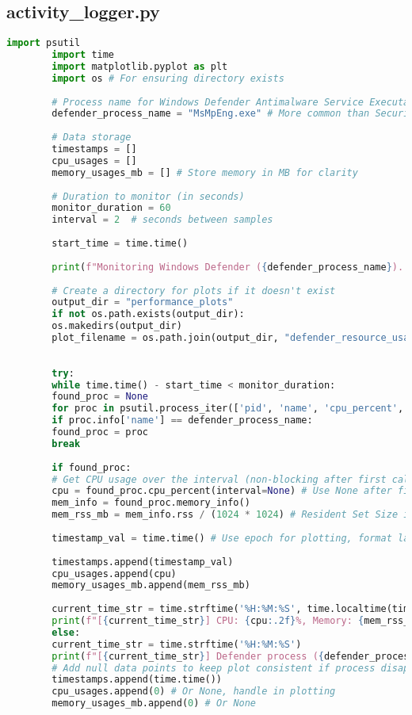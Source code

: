 \documentclass[11pt]{article}
\begin{document}
	\subsection{activity_logger.py}
	\begin{lstlisting}[language=Python, caption=activity_logger.py - Windows Defender Resource Monitor, basicnumbers=left, numberstyle=\tiny\color{gray}, stringstyle=\color{purple}, commentstyle=\color{olive}, keywordstyle=\color{blue}, breaklines=true, breakatwhitespace=true, tabsize=4, showstringspaces=false]
		import psutil
		import time
		import matplotlib.pyplot as plt
		import os # For ensuring directory exists
		
		# Process name for Windows Defender Antimalware Service Executable
		defender_process_name = "MsMpEng.exe" # More common than SecurityHealthService.exe for core engine
		
		# Data storage
		timestamps = []
		cpu_usages = []
		memory_usages_mb = [] # Store memory in MB for clarity
		
		# Duration to monitor (in seconds)
		monitor_duration = 60 
		interval = 2  # seconds between samples
		
		start_time = time.time()
		
		print(f"Monitoring Windows Defender ({defender_process_name})...")
		
		# Create a directory for plots if it doesn't exist
		output_dir = "performance_plots"
		if not os.path.exists(output_dir):
		os.makedirs(output_dir)
		plot_filename = os.path.join(output_dir, "defender_resource_usage_live.png")
		
		
		try:
		while time.time() - start_time < monitor_duration:
		found_proc = None
		for proc in psutil.process_iter(['pid', 'name', 'cpu_percent', 'memory_info']):
		if proc.info['name'] == defender_process_name:
		found_proc = proc
		break
		
		if found_proc:
		# Get CPU usage over the interval (non-blocking after first call)
		cpu = found_proc.cpu_percent(interval=None) # Use None after first call
		mem_info = found_proc.memory_info()
		mem_rss_mb = mem_info.rss / (1024 * 1024) # Resident Set Size in MB
		
		timestamp_val = time.time() # Use epoch for plotting, format later for labels
		
		timestamps.append(timestamp_val)
		cpu_usages.append(cpu)
		memory_usages_mb.append(mem_rss_mb)
		
		current_time_str = time.strftime('%H:%M:%S', time.localtime(timestamp_val))
		print(f"[{current_time_str}] CPU: {cpu:.2f}%, Memory: {mem_rss_mb:.2f} MB")
		else:
		current_time_str = time.strftime('%H:%M:%S')
		print(f"[{current_time_str}] Defender process ({defender_process_name}) not found.")
		# Add null data points to keep plot consistent if process disappears
		timestamps.append(time.time())
		cpu_usages.append(0) # Or None, handle in plotting
		memory_usages_mb.append(0) # Or None
		

\end{lstlisting}
\end{document}
